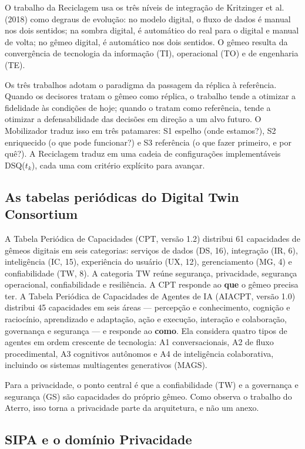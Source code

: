 \documentclass[12pt,a4paper,article,oneside,english,brazil]{abntex2}
\newcommand{\dsq}[1]{DSQ($t_{#1}$)}
\begin{document}
O trabalho da Reciclagem usa os três níveis de integração de Kritzinger et al. (2018) como degraus de evolução: no modelo digital, o fluxo de dados é manual nos dois sentidos; na sombra digital, é automático do real para o digital e manual de volta; no gêmeo digital, é automático nos dois sentidos. O gêmeo resulta da convergência de tecnologia da informação (TI), operacional (TO) e de engenharia (TE).

Os três trabalhos adotam o paradigma da passagem da réplica à referência. Quando os decisores tratam o gêmeo como réplica, o trabalho tende a otimizar a fidelidade às condições de hoje; quando o tratam como referência, tende a otimizar a defensabilidade das decisões em direção a um alvo futuro. O Mobilizador traduz isso em três patamares: S1 espelho (onde estamos?), S2 enriquecido (o que pode funcionar?) e S3 referência (o que fazer primeiro, e por quê?). A Reciclagem traduz em uma cadeia de configurações implementáveis \dsq{k}, cada uma com critério explícito para avançar.

\subsection{As tabelas periódicas do Digital Twin Consortium}

A Tabela Periódica de Capacidades (CPT, versão 1.2) distribui 61 capacidades de gêmeos digitais em seis categorias: serviços de dados (DS, 16), integração (IR, 6), inteligência (IC, 15), experiência do usuário (UX, 12), gerenciamento (MG, 4) e confiabilidade (TW, 8). A categoria TW reúne segurança, privacidade, segurança operacional, confiabilidade e resiliência. A CPT responde ao \textbf{que} o gêmeo precisa ter. A Tabela Periódica de Capacidades de Agentes de IA (AIACPT, versão 1.0) distribui 45 capacidades em seis áreas --- percepção e conhecimento, cognição e raciocínio, aprendizado e adaptação, ação e execução, interação e colaboração, governança e segurança --- e responde ao \textbf{como}. Ela considera quatro tipos de agentes em ordem crescente de tecnologia: A1 conversacionais, A2 de fluxo procedimental, A3 cognitivos autônomos e A4 de inteligência colaborativa, incluindo os sistemas multiagentes generativos (MAGS).

Para a privacidade, o ponto central é que a confiabilidade (TW) e a governança e segurança (GS) são capacidades do próprio gêmeo. Como observa o trabalho do Aterro, isso torna a privacidade parte da arquitetura, e não um anexo.

\subsection{SIPA e o domínio Privacidade}
\end{document}
